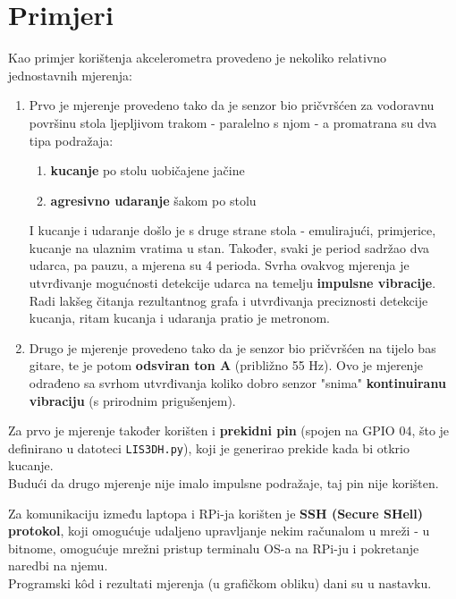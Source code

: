 \documentclass[12pt,a4paper]{article}
\begin{document}
\section{Primjeri}
	Kao primjer korištenja akcelerometra provedeno je nekoliko relativno jednostavnih mjerenja:
	\begin{enumerate}
		\item Prvo je mjerenje provedeno tako da je senzor bio pričvršćen za vodoravnu površinu stola ljepljivom trakom - paralelno s njom - a promatrana su dva tipa podražaja:
		\begin{enumerate}
			\item \textbf{kucanje} po stolu uobičajene jačine
			\item \textbf{agresivno udaranje} šakom po stolu
		\end{enumerate}
		I kucanje i udaranje došlo je s druge strane stola - emulirajući, primjerice, kucanje na ulaznim vratima u stan. Također, svaki je period sadržao dva udarca, pa pauzu, a mjerena su 4 perioda. Svrha ovakvog mjerenja je utvrđivanje mogućnosti detekcije udarca na temelju \textbf{impulsne vibracije}. Radi lakšeg čitanja rezultantnog grafa i utvrđivanja preciznosti detekcije kucanja, ritam kucanja i udaranja pratio je metronom.
		\item Drugo je mjerenje provedeno tako da je senzor bio pričvršćen na tijelo bas gitare, te je potom \textbf{odsviran ton A} (približno 55 Hz). Ovo je mjerenje odrađeno sa svrhom utvrđivanja koliko dobro senzor "snima" \textbf{kontinuiranu vibraciju} (s prirodnim prigušenjem).
	\end{enumerate}

	Za prvo je mjerenje također korišten i \textbf{prekidni pin} (spojen na GPIO 04, što je definirano u datoteci \texttt{LIS3DH.py}), koji je generirao prekide kada bi otkrio kucanje.\\
	Budući da drugo mjerenje nije imalo impulsne podražaje, taj pin nije korišten. \\

	\par Za komunikaciju između laptopa i RPi-ja korišten je \textbf{SSH (Secure SHell) protokol}, koji omogućuje udaljeno upravljanje nekim računalom u mreži - u bitnome, omogućuje mrežni pristup terminalu OS-a na RPi-ju i pokretanje naredbi na njemu. \\

	Programski kôd i rezultati mjerenja (u grafičkom obliku) dani su u nastavku. \\
\end{document}

